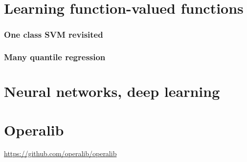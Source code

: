 \section{Learning function-valued functions}
\subsubsection{One class SVM revisited}

\subsubsection{Many quantile regression}

\section{Neural networks, deep learning}

\section{Operalib}
\url{https://github.com/operalib/operalib}
